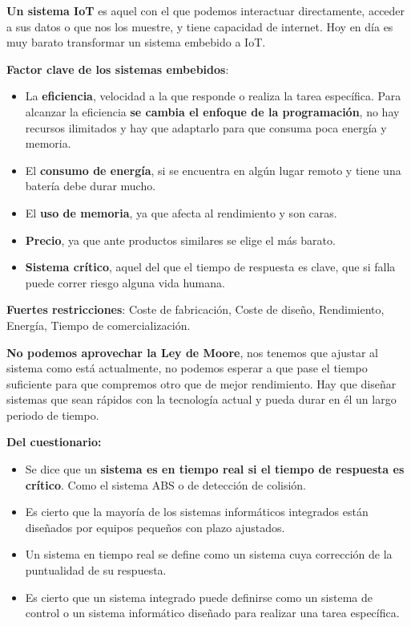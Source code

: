 \documentclass[12pt, twoside, openright]{report} %
\begin{document}
\textbf{Un sistema IoT} es aquel con el que podemos interactuar
directamente, acceder a sus datos o que nos los muestre, y tiene
capacidad de internet. Hoy en día es muy barato transformar un sistema
embebido a IoT.

\textbf{Factor clave de los sistemas embebidos}:

\begin{itemize}
	\item La \textbf{eficiencia}, velocidad a la que responde o realiza la tarea
	      específica. Para alcanzar la eficiencia \textbf{se cambia el enfoque
		      de la programación}, no hay recursos ilimitados y hay que adaptarlo
	      para que consuma poca energía y memoria.
	\item El \textbf{consumo de energía}, si se encuentra en algún lugar remoto
	      y tiene una batería debe durar mucho.
	\item El \textbf{uso de memoria}, ya que afecta al rendimiento y son caras.
	\item \textbf{Precio}, ya que ante productos similares se elige el más
	      barato.
	\item \textbf{Sistema crítico}, aquel del que el tiempo de respuesta es
	      clave, que si falla puede correr riesgo alguna vida humana.
\end{itemize}

\textbf{Fuertes restricciones}: Coste de fabricación, Coste de diseño, Rendimiento, Energía, Tiempo de comercialización.

\textbf{No podemos aprovechar la Ley de Moore}, nos tenemos que ajustar
al sistema como está actualmente, no podemos esperar a que pase el
tiempo suficiente para que compremos otro que de mejor rendimiento. Hay
que diseñar sistemas que sean rápidos con la tecnología actual y pueda
durar en él un largo periodo de tiempo.

\textbf{Del cuestionario:}

\begin{itemize}
	\item Se dice que un \textbf{sistema es en tiempo real si el tiempo de
		      respuesta es crítico}. Como el sistema ABS o de detección de colisión.
	\item Es cierto que la mayoría de los sistemas informáticos integrados están
	      diseñados por equipos pequeños con plazo ajustados.
	\item Un sistema en tiempo real se define como un sistema cuya corrección de
	      la puntualidad de su respuesta.
	\item Es cierto que un sistema integrado puede definirse como un sistema de
	      control o un sistema informático diseñado para realizar una tarea
	      específica.
\end{itemize}
\end{document}
